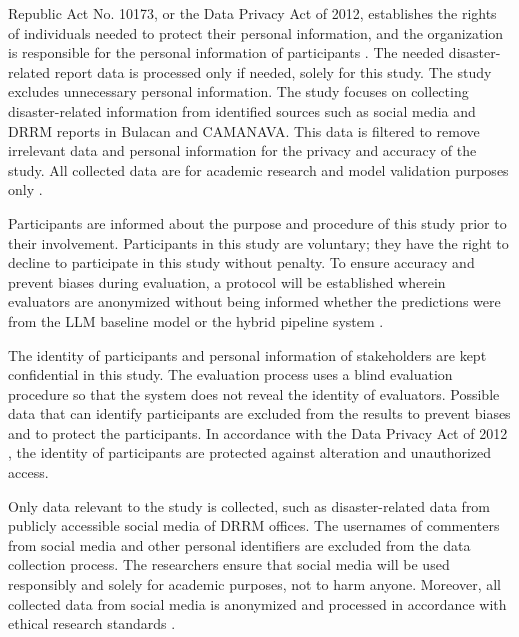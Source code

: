 \begin{description}[style=nextline,leftmargin=0pt]
	\item[Data Privacy and Confidentiality.] Republic Act No. 10173, or the Data
	Privacy Act of 2012, establishes the rights of individuals needed to protect
	their personal information, and the organization is responsible for the
	personal information of participants \parencite{ra10173}. The needed
	disaster-related report data is processed only if needed, solely for
	this study. The study excludes unnecessary personal information. The
	study focuses on collecting disaster-related information from identified
	sources such as social media and DRRM reports in Bulacan and CAMANAVA. This
	data is filtered to remove irrelevant data and personal information for
	the privacy and accuracy of the study. All collected data are for academic
	research and model validation purposes only \parencite{npc2016}.
	
	\item[Voluntary Participation and Informed Consent.] Participants are
	informed about the purpose and procedure of this study prior to their
	involvement. Participants in this study are voluntary; they have the right to
	decline to participate in this study without penalty. To ensure accuracy and
	prevent biases during evaluation, a protocol will be established wherein
	evaluators are anonymized without being informed whether the predictions
	were from the LLM baseline model or the hybrid pipeline system
	\parencite{belmont1979}.
	
	\item[Confidentiality of Participants.] The identity of participants and
	personal information of stakeholders are kept confidential in this study.
	The evaluation process uses a blind evaluation procedure so that the
	system does not reveal the identity of evaluators. Possible data that can
	identify participants are excluded from the results to prevent biases and
	to protect the participants. In accordance with the Data Privacy Act of 2012
	\parencite{ra10173, npc2016}, the identity of participants are protected
	against alteration and unauthorized access.
	
	\item[Responsible Use of Social Media Data.] Only data relevant to the study
	is collected, such as disaster-related data from publicly accessible
	social media of DRRM offices. The usernames of commenters from social media
	and other personal identifiers are excluded from the data collection
	process. The researchers ensure that social media will be used responsibly
	and solely for academic purposes, not to harm anyone. Moreover, all collected
	data from social media is anonymized and processed in accordance with
	ethical research standards \parencite{npc2016}.
	

\end{description}
